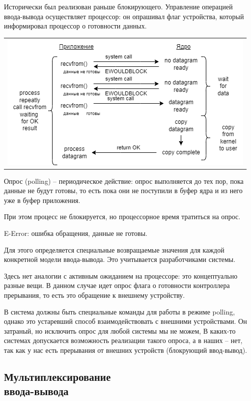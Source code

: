 Исторически был реализован раньше блокирующего. Управление операцией ввода-вывода осуществляет процессор: он опрашивал флаг устройства, который информировал процессор о готовности данных.
\begin{table}[H]
  \centering
  \begin{tabular}{p{1\linewidth}}
    \centering
    \includegraphics[width=0.8\linewidth]{./images/1-2.png}
  \end{tabular}
\end{table}

Опрос (polling) – периодическое действие: опрос выполняется до тех пор, пока данные не будут готовы, то есть пока они не поступили в буфер ядра и из него уже в буфер приложения.

При этом процесс не блокируется, но процессорное время тратиться на опрос. 

E-Error: ошибка обращения, данные не готовы.

Для этого определяется специальные возвращаемые значения для каждой конкретной модели ввода-вывода. Это учитывается разработчиками системы.

Здесь нет аналогии с активным ожиданием на процессоре: это концептуально разные вещи. В данном случае идет опрос флага о готовности контроллера прерывания, то есть это обращение к внешнему устройству.

В система должны быть специальные команды для работы в режиме polling, однако это устаревший способ взаимодействовать с внешними устройствами. Он затраный, но исключить опрос для любой системы мы не можем, В каких-то системах допускается возможность реализации такого опроса, а в наших – нет, так как у нас есть прерывания от внешних устройств (блокрующий ввод-вывод).

\subsection{Мультиплексирование \\ ввода-вывода}

